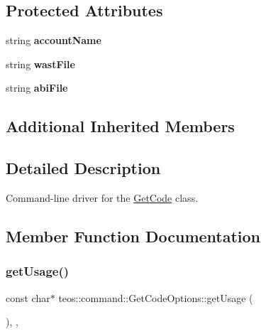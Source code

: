 \subsection*{Protected Attributes}
\begin{DoxyCompactItemize}
\item 
\mbox{\label{classteos_1_1command_1_1_get_code_options_a2ccae73659e64448134d2eecddeb21ff}} 
string {\bfseries account\+Name}
\item 
\mbox{\label{classteos_1_1command_1_1_get_code_options_ad226800b10886af89bad7c066b480d8f}} 
string {\bfseries wast\+File}
\item 
\mbox{\label{classteos_1_1command_1_1_get_code_options_ad1e0831f8b59c49e786831acb69d055d}} 
string {\bfseries abi\+File}
\end{DoxyCompactItemize}
\subsection*{Additional Inherited Members}


\subsection{Detailed Description}
Command-\/line driver for the \mbox{\hyperlink{classteos_1_1command_1_1_get_code}{Get\+Code}} class. 

\subsection{Member Function Documentation}
\mbox{\label{classteos_1_1command_1_1_get_code_options_a62a3c2c3cc72eb8b9bd5034fb335c7e2}} 
\subsubsection{\texorpdfstring{get\+Usage()}{getUsage()}}
{\footnotesize\ttfamily const char$\ast$ teos\+::command\+::\+Get\+Code\+Options\+::get\+Usage (\begin{DoxyParamCaption}{ }\end{DoxyParamCaption})\hspace{0.3cm}{\ttfamily [inline]}, {\ttfamily [protected]}, {\ttfamily [virtual]}}



